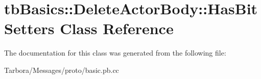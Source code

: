 \hypertarget{classtbBasics_1_1DeleteActorBody_1_1HasBitSetters}{}\section{tb\+Basics\+:\+:Delete\+Actor\+Body\+:\+:Has\+Bit\+Setters Class Reference}
\label{classtbBasics_1_1DeleteActorBody_1_1HasBitSetters}


The documentation for this class was generated from the following file\+:\begin{DoxyCompactItemize}
\item 
Tarbora/\+Messages/proto/basic.\+pb.\+cc\end{DoxyCompactItemize}
